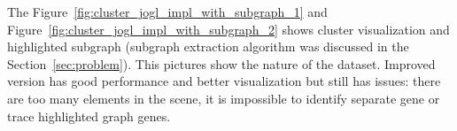 The Figure~\ref{fig:cluster_jogl_impl_with_subgraph_1} and Figure~\ref{fig:cluster_jogl_impl_with_subgraph_2} shows cluster visualization and highlighted subgraph (subgraph extraction algorithm was discussed in the Section~\ref{sec:problem}). This pictures show the nature of the dataset. Improved version has good performance and better visualization but still has issues: there are too many elements in the scene, it is impossible to identify separate gene or trace highlighted graph genes.

\begin{figure}[h!]
\centering
{}
\end{figure}
